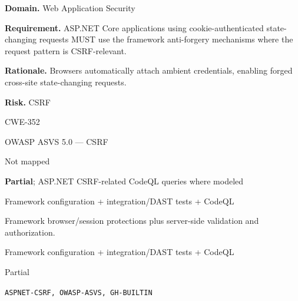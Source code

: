 \documentclass[10pt,letterpaper]{article}
\newcommand{\prioritybadge}[2]{\tcbox[on line,boxrule=0pt,arc=1.2mm,boxsep=0.7mm,left=1mm,right=1mm,top=0.4mm,bottom=0.4mm,colback=#2!12,coltext=#2]{\scriptsize\bfseries #1}}
\begin{document}
\begin{rulebox}[title={\texttt{SCS-CSHARP-WEB-001} \hfill \prioritybadge{Critical Control}{Critical}}]
\textbf{Domain.} Web Application Security

\textbf{Requirement.} ASP.NET Core applications using cookie-authenticated state-changing requests MUST use the framework anti-forgery mechanisms where the request pattern is CSRF-relevant.

\textbf{Rationale.} Browsers automatically attach ambient credentials, enabling forged cross-site state-changing requests.

\textbf{Risk.} CSRF

\begin{description}[leftmargin=2.65cm,labelwidth=2.3cm,style=nextline,itemsep=1pt,topsep=3pt]
  \item[CWE] CWE-352
  \item[OWASP] OWASP ASVS 5.0 --- CSRF
  \item[CERT] Not mapped
  \item[CodeQL] \textbf{Partial}; ASP.NET CSRF-related CodeQL queries where modeled
  \item[Enforcement] Framework configuration + integration/DAST tests + CodeQL
  \item[Prevention] Framework browser/session protections plus server-side validation and authorization.
  \item[Verification] Framework configuration + integration/DAST tests + CodeQL
  \item[Automation] Partial
  \item[Sources] \texttt{ASPNET-CSRF, OWASP-ASVS, GH-BUILTIN}
\end{description}
\end{rulebox}
\end{document}
